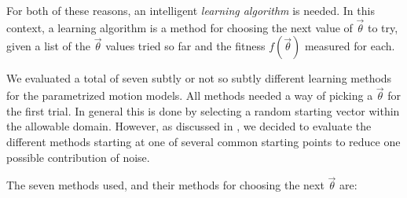 For both of these reasons, an intelligent \emph{learning algorithm} is
needed.
In this context, a learning algorithm is a method for choosing
the next value of $\vec{\theta}$ to try, given a list of the
$\vec{\theta}$ values tried so far and the fitness $f(\vec{\theta})$
measured for each.

We evaluated a total of seven subtly or not so subtly different
learning methods for the parametrized motion models.  All methods
needed a way of picking a $\vec{\theta}$ for the first trial.  In
general this is done by selecting a random starting vector within the
allowable domain.  However, as discussed in
, we decided to evaluate the different
methods starting at one of several common starting points to reduce
one possible contribution of noise.


The seven methods used, and their methods for choosing the next
$\vec{\theta}$ are:






